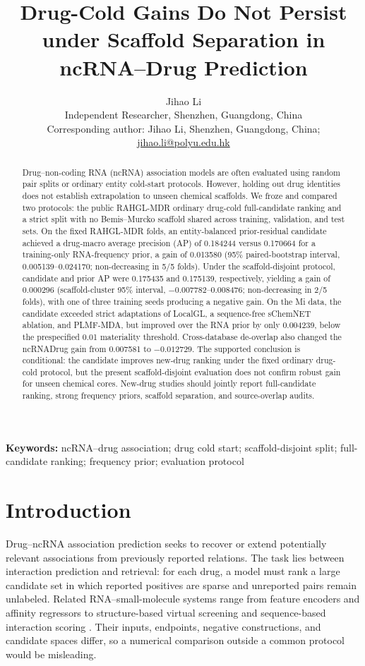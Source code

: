 \documentclass[10pt]{article}
\title{Drug-Cold Gains Do Not Persist under Scaffold Separation in ncRNA--Drug Prediction}
\author{Jihao Li\\
  \small Independent Researcher, Shenzhen, Guangdong, China\\
  \small Corresponding author: Jihao Li, Shenzhen, Guangdong, China; \href{mailto:jihao.li@polyu.edu.hk}{jihao.li@polyu.edu.hk}}
\date{}
\begin{document}
\maketitle

\begin{abstract}
Drug--non-coding RNA (ncRNA) association models are often evaluated using random pair splits or ordinary entity cold-start protocols. However, holding out drug identities does not establish extrapolation to unseen chemical scaffolds. We froze and compared two protocols: the public RAHGL-MDR ordinary drug-cold full-candidate ranking and a strict split with no Bemis--Murcko scaffold shared across training, validation, and test sets. On the fixed RAHGL-MDR folds, an entity-balanced prior-residual candidate achieved a drug-macro average precision (AP) of 0.184244 versus 0.170664 for a training-only RNA-frequency prior, a gain of 0.013580 (95\% paired-bootstrap interval, 0.005139--0.024170; non-decreasing in 5/5 folds). Under the scaffold-disjoint protocol, candidate and prior AP were 0.175435 and 0.175139, respectively, yielding a gain of 0.000296 (scaffold-cluster 95\% interval, $-0.007782$--0.008476; non-decreasing in 2/5 folds), with one of three training seeds producing a negative gain. On the Mi data, the candidate exceeded strict adaptations of LocalGL, a sequence-free sChemNET ablation, and PLMF-MDA, but improved over the RNA prior by only 0.004239, below the prespecified 0.01 materiality threshold. Cross-database de-overlap also changed the ncRNADrug gain from 0.007581 to $-0.012729$. The supported conclusion is conditional: the candidate improves new-drug ranking under the fixed ordinary drug-cold protocol, but the present scaffold-disjoint evaluation does not confirm robust gain for unseen chemical cores. New-drug studies should jointly report full-candidate ranking, strong frequency priors, scaffold separation, and source-overlap audits.
\end{abstract}

\noindent\textbf{Keywords:} ncRNA--drug association; drug cold start; scaffold-disjoint split; full-candidate ranking; frequency prior; evaluation protocol

\section{Introduction}

Drug--ncRNA association prediction seeks to recover or extend potentially relevant associations from previously reported relations. The task lies between interaction prediction and retrieval: for each drug, a model must rank a large candidate set in which reported positives are sparse and unreported pairs remain unlabeled. Related RNA--small-molecule systems range from feature encoders and affinity regressors to structure-based virtual screening and sequence-based interaction scoring \citep{wang2023rnaincoder,oliver2020rnamigos,carvajalpatino2025rnamigos2,krishnan2024rsapred,ma2025rnasmol}. Their inputs, endpoints, negative constructions, and candidate spaces differ, so a numerical comparison outside a common protocol would be misleading.
\end{document}
